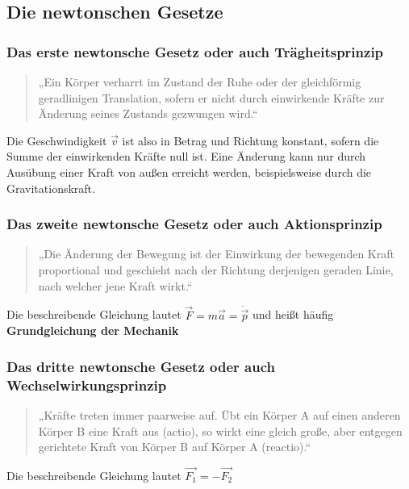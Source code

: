 \documentclass[../document.tex]{subfiles}
\begin{document}
\subsection{Die newtonschen Gesetze}

\subsubsection{Das erste newtonsche Gesetz oder auch Trägheitsprinzip}

\begin{quote}
„Ein Körper verharrt im Zustand der Ruhe oder der gleichförmig geradlinigen Translation, sofern er nicht durch einwirkende Kräfte zur Änderung seines Zustands gezwungen wird.“
\end{quote}

Die Geschwindigkeit $\vec{v}$ ist also in Betrag und Richtung konstant, sofern die Summe der einwirkenden Kräfte null ist. Eine Änderung kann nur durch Ausübung einer Kraft von außen erreicht werden, beispielsweise durch die Gravitationskraft.


\subsubsection {Das zweite newtonsche Gesetz oder auch Aktionsprinzip}

\begin{quote}
„Die Änderung der Bewegung ist der Einwirkung der bewegenden Kraft proportional und geschieht nach der Richtung derjenigen geraden Linie, nach welcher jene Kraft wirkt.“
\end{quote}

Die beschreibende Gleichung lautet $\vec{F} = m\vec{a} = \dot{\vec{p}}$ und heißt häufig \textbf{Grundgleichung der Mechanik} 


\subsubsection {Das dritte newtonsche Gesetz oder auch Wechselwirkungsprinzip}

\begin{quote}
„Kräfte treten immer paarweise auf. Übt ein Körper A auf einen anderen Körper B eine Kraft aus (actio), so wirkt eine gleich große, aber entgegen gerichtete Kraft von Körper B auf Körper A (reactio).“
\end{quote}

Die beschreibende Gleichung lautet $\vec{F_1} = -\vec{F_2}$ 
\end{document}

